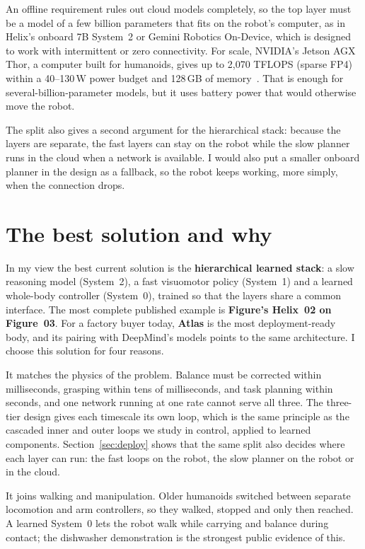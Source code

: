 \documentclass[11pt,a4paper]{article}
\begin{document}
An offline requirement rules out cloud models completely, so the top layer
must be a model of a few billion parameters that fits on the robot's computer,
as in Helix's onboard 7B System~2 or Gemini Robotics On-Device, which is
designed to work with intermittent or zero connectivity.  For scale, NVIDIA's
Jetson AGX Thor, a computer built for humanoids, gives up to 2{,}070 TFLOPS
(sparse FP4) within a 40--130\,W power budget and 128\,GB of
memory~\cite{jetson-thor}.  That is enough for several-billion-parameter
models, but it uses battery power that would otherwise move the robot.

The split also gives a second argument for the hierarchical stack: because the
layers are separate, the fast layers can stay on the robot while the slow
planner runs in the cloud when a network is available.  I would also put a
smaller onboard planner in the design as a fallback, so the robot keeps
working, more simply, when the connection drops.

\section{The best solution and why}

In my view the best current solution is the \textbf{hierarchical learned
stack}: a slow reasoning model (System~2), a fast visuomotor policy
(System~1) and a learned whole-body controller (System~0), trained so that the
layers share a common interface.  The most complete published example is
\textbf{Figure's Helix~02 on Figure~03}.  For a factory buyer today,
\textbf{Atlas} is the most deployment-ready body, and its pairing with
DeepMind's models points to the same architecture.  I choose this solution for
four reasons.

It matches the physics of the problem.  Balance must be corrected within
milliseconds, grasping within tens of milliseconds, and task planning within
seconds, and one network running at one rate cannot serve all three.  The
three-tier design gives each timescale its own loop, which is the same
principle as the cascaded inner and outer loops we study in control, applied to
learned components.  Section~\ref{sec:deploy} shows that the same split also
decides where each layer can run: the fast loops on the robot, the slow planner
on the robot or in the cloud.

It joins walking and manipulation.  Older humanoids switched between separate
locomotion and arm controllers, so they walked, stopped and only then reached.
A learned System~0 lets the robot walk while carrying and balance during
contact; the dishwasher demonstration is the strongest public evidence of this.
\end{document}
